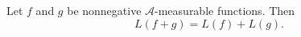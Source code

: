 Let $f$ and $g$ be nonnegative $\mathcal{A}$-measurable functions. Then $$L(f + g) = L(f) + L(g).$$
